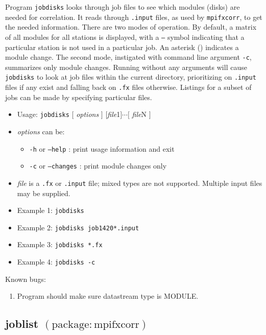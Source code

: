 Program {\tt jobdisks} looks through job files to see which modules (disks) are needed for correlation.
It reads through {\tt .input} files, as used by {\tt mpifxcorr}, to get the needed information.
There are two modes of operation.
By default, a matrix of all modules for all stations is displayed, with a {\tt --} symbol indicating that a particular station is not used in a particular job.
An asterisk ({\tt *}) indicates a module change.
The second mode, instigated with command line argument {\tt -c}, summarizes only module changes.
Running without any arguments will cause {\tt jobdisks} to look at job files within the current directory, prioritizing on {\tt .input} files if any exist and falling back on {\tt .fx} files otherwise.
Listings for a subset of jobs can be made by specifying particular files.

\begin{itemize}
\item[] Usage: {\tt jobdisks} $[$ {\em options} $]$ $[${\em file}1$] \cdots [$ {\em file}N $]$
\item[] {\em options} can be:
\begin{itemize}
\item[] {\tt -h} or {\tt --help} : print usage information and exit
\item[] {\tt -c} or {\tt --changes} : print module changes only
\end{itemize}
\item[] {\em file} is a {\tt .fx} or {\tt .input} file; mixed types are not supported. 
Multiple input files may be supplied.
\item[] Example 1: {\tt jobdisks}
\item[] Example 2: {\tt jobdisks job1420*.input}
\item[] Example 3: {\tt jobdisks *.fx}
\item[] Example 4: {\tt jobdisks -c}
\end{itemize}


\noindent
Known bugs:
\begin{enumerate}
\item Program should make sure datastream type is MODULE.
\end{enumerate}







\subsection{joblist {\small $\mathrm{(package: mpifxcorr)}$}} \label{sec:joblist}


